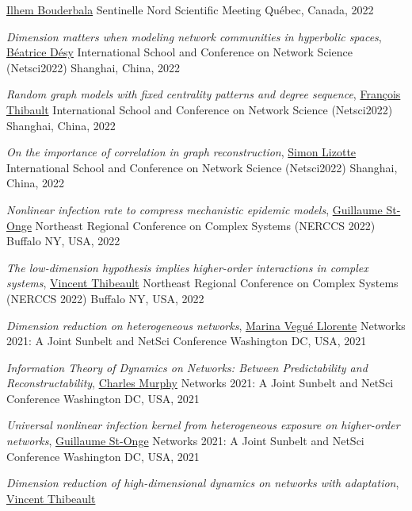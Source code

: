 \documentclass[11pt]{article}
\makeatletter
\newcommand{\reversearabic}[1]{\expandafter\@reversearabic\csname c@#1\endcsname}
\newcommand{\@reversearabic}[1]{%
  \number\numexpr\getrefnumber{this@etaremune@\romannumeral\c@etaremune}-#1+1\relax
}
\newcounter{etaremune}
\newenvironment{etaremune}[1][]{%
  \stepcounter{etaremune}%
  \begin{enumerate}[label=\reversearabic*.,#1]%
}{%
  \edef\@currentlabel{\the\csname c@\@enumctr\endcsname}%
  \label{this@etaremune@\romannumeral\c@etaremune}%
  \end{enumerate}%
}
\makeatother
\begin{document}
\begin{etaremune}[itemsep=0.5em, label={[M\reversearabic*]}, first*=\small\vspace{0.5\baselineskip}]
{  \uline{Ilhem Bouderbala}\split
  Sentinelle Nord Scientific Meeting\split
  Québec, Canada, 2022}
%
  \item \parbox[t]{\textwidth-30pt}{\textit{Dimension matters when modeling network communities in hyperbolic spaces},
  \uline{Béatrice Désy}\split
  International School and Conference on Network Science (Netsci2022)\split
  Shanghai, China, 2022}
%
  \item \parbox[t]{\textwidth-30pt}{\textit{Random graph models with fixed centrality patterns and degree sequence},
  \uline{François Thibault}\split
  International School and Conference on Network Science (Netsci2022)\split
  Shanghai, China, 2022}
%
  \item \parbox[t]{\textwidth-30pt}{\textit{On the importance of correlation in graph reconstruction},
  \uline{Simon Lizotte}\split
  International School and Conference on Network Science (Netsci2022)\split
  Shanghai, China, 2022}
%
  \item \parbox[t]{\textwidth-30pt}{\textit{Nonlinear infection rate to compress mechanistic epidemic models},
  \uline{Guillaume St-Onge}\split
  Northeast Regional Conference on Complex Systems (NERCCS 2022)\split
  Buffalo NY, USA, 2022}
%
  \item \parbox[t]{\textwidth-30pt}{\textit{The low-dimension hypothesis implies higher-order interactions in complex systems},
  \uline{Vincent Thibeault}\split
  Northeast Regional Conference on Complex Systems (NERCCS 2022)\split
  Buffalo NY, USA, 2022}
%
  \item \parbox[t]{\textwidth-30pt}{\textit{Dimension reduction on heterogeneous networks},
  \uline{Marina Vegué Llorente}\split
  Networks 2021: A Joint Sunbelt and NetSci Conference\split
  Washington DC, USA, 2021}
%
  \item \parbox[t]{\textwidth-30pt}{\textit{Information Theory of Dynamics on Networks: Between Predictability and Reconstructability},
  \uline{Charles Murphy}\split
  Networks 2021: A Joint Sunbelt and NetSci Conference\split
  Washington DC, USA, 2021}
%
  \item \parbox[t]{\textwidth-30pt}{\textit{Universal nonlinear infection kernel from heterogeneous exposure on higher-order networks},
  \uline{Guillaume St-Onge}\split
  Networks 2021: A Joint Sunbelt and NetSci Conference\split
  Washington DC, USA, 2021}
%
  \item \parbox[t]{\textwidth-30pt}{\textit{Dimension reduction of high-dimensional dynamics on networks with adaptation},
  \uline{Vincent Thibeault}\split
}
\end{etaremune}
\end{document}
